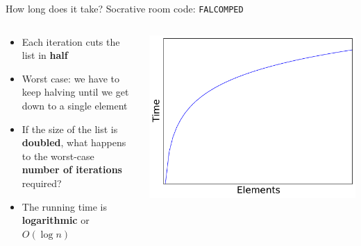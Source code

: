 \begin{frame}{How long does it take?}
	Socrative room code: \texttt{FALCOMPED}
	\begin{columns}
		\begin{column}{0.55\textwidth}
			\begin{itemize}
				\item Each iteration cuts the list in \textbf{half} \pause
				\item Worst case: we have to keep halving until we get down to a single element \pause
				\item If the size of the list is \textbf{doubled}, what happens to the worst-case
					\textbf{number of iterations} required? \pause
				\iftoggle{printable}{}{\item \textbf{Answer:} it increases by 1 \pause}
				\item The running time is \textbf{logarithmic} or $O(\log n)$ \pause
			\end{itemize}
		\end{column}
		\begin{column}{0.45\textwidth}
			\includegraphics[width=\textwidth]{plot2_log}
		\end{column}
	\end{columns}
\end{frame}

